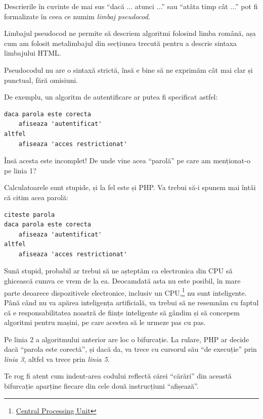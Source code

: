 Descrierile în cuvinte de mai sus ``dacă ... atunci ...''
sau ``atâta timp cât ...'' pot fi formalizate în ceea
ce numim \textsl{limbaj pseudocod}. 

Limbajul pseudocod ne permite să descriem algoritmi
folosind limba română, așa cum am folosit metalimbajul
din secțiunea trecută pentru a descrie sintaxa limbajului HTML.

Pseudocodul nu are o sintaxă strictă, însă e bine să
ne exprimăm cât mai clar și punctual, fără omisiuni.

De exemplu, un algoritm de autentificare ar putea
fi specificat astfel:
\begin{lstlisting}[language=pseudocod]
daca parola este corecta
	afiseaza 'autentificat'
altfel
	afiseaza 'acces restrictionat'
\end{lstlisting}
Însă acesta este incomplet! De unde vine
acea ``parolă'' pe care am menționat-o pe linia 1?

Calculatoarele sunt stupide, și la fel este și PHP. Va
trebui să-i spunem mai întâi că citim acea parolă:
\begin{lstlisting}[language=pseudocod]
citeste parola
daca parola este corecta
	afiseaza 'autentificat'
altfel
	afiseaza 'acces restrictionat'
\end{lstlisting}

Sună stupid, probabil ar trebui să ne așteptăm
ca electronica din CPU să ghicească cumva
ce vrem de la ea. Deocamdată asta nu este posibil,
în mare parte deoarece dispozitivele electronice,
inclusiv un
CPU,\footnote{\href{http://en.wikipedia.org/wiki/Central_processing_unit}{Central Processing Unit}} nu sunt inteligente.
Până când nu va apărea inteligența artificială,
va trebui să ne resemnăm cu faptul că e responsabilitatea
noastră de ființe inteligente să gândim și să
concepem algoritmi pentru mașini, pe care
acestea să le urmeze pas cu pas.

Pe linia 2 a algoritmului anterior are loc o bifurcație.
La rulare, PHP ar decide dacă ``parola este corectă'', și dacă
da, va trece cu cursorul său ``de execuție'' prin \textit{linia 3},
altfel va trece prin \textit{linia 5}. 

Te rog fi atent cum indent-area codului reflectă cărei ``cărări''
din această bifurcație aparține fiecare din cele două instrucțiuni
``afișează''.

